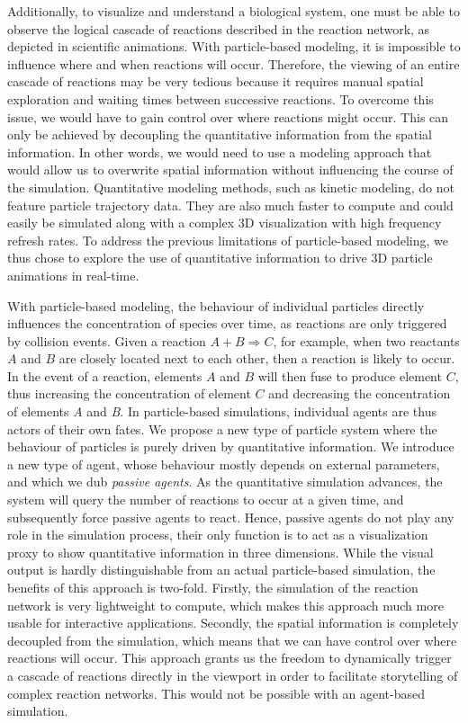Additionally, to visualize and understand a biological system, one must be able to observe the logical cascade of reactions described in the reaction network, as depicted in scientific animations.
With particle-based modeling, it is impossible to influence where and when reactions will occur.
Therefore, the viewing of an entire cascade of reactions may be very tedious because it requires manual spatial exploration and waiting times between successive reactions.
To overcome this issue, we would have to gain control over where reactions might occur.
This can only be achieved by decoupling the quantitative information from the spatial information.
In other words, we would need to use a modeling approach that would allow us to overwrite spatial information without influencing the course of the simulation.
Quantitative modeling methods, such as kinetic modeling, do not feature particle trajectory data.
They are also much faster to compute and could easily be simulated along with a complex 3D visualization with high frequency refresh rates.
To address the previous limitations of particle-based modeling, we thus chose to explore the use of quantitative information to drive 3D particle animations in real-time.

With particle-based modeling, the behaviour of individual particles directly influences the concentration of species over time, as reactions are only triggered by collision events.
Given a reaction $A + B \Rightarrow C$, for example, when two reactants $A$ and $B$ are closely located next to each other, then a reaction is likely to occur.
In the event of a reaction, elements $A$ and $B$ will then fuse to produce element $C$, thus increasing the concentration of element $C$ and decreasing the concentration of elements \textit{A} and \textit{B}.
In particle-based simulations, individual agents are thus actors of their own fates.
We propose a new type of particle system where the behaviour of particles is purely driven by quantitative information.
We introduce a new type of agent, whose behaviour mostly depends on external parameters, and which we dub \emph{passive agents}.
As the quantitative simulation advances, the system will query the number of reactions to occur at a given time, and subsequently force passive agents to react.
Hence, passive agents do not play any role in the simulation process, their only function is to act as a visualization proxy to show quantitative information in three dimensions.
While the visual output is hardly distinguishable from an actual particle-based simulation, the benefits of this approach is two-fold.
Firstly, the simulation of the reaction network is very lightweight to compute, which makes this approach much more usable for interactive applications.
Secondly, the spatial information is completely decoupled from the simulation, which means that we can have control over where reactions will occur.
This approach grants us the freedom to dynamically trigger a cascade of reactions directly in the viewport in order to facilitate storytelling of complex reaction networks.
This would not be possible with an agent-based simulation.

